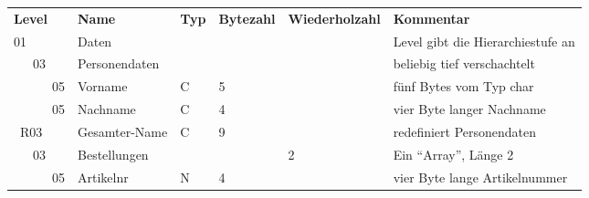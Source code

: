 \begin{tabularx}{\textwidth}{llllll}
\textbf{Level}  & \textbf{Name} & \textbf{Typ} & \textbf{Bytezahl} & \textbf{Wiederholzahl} & \textbf{Kommentar} \\
01 & Daten & & & & Level gibt die Hierarchiestufe an\\
\ \ \ 03 & Personendaten & & & & beliebig tief verschachtelt\\
\ \ \ \ \ \ 05 & Vorname & C & 5 & & fünf Bytes vom Typ char\\
\ \ \ \ \ \ 05 & Nachname & C & 4 & & vier Byte langer Nachname\\
\ R03 & Gesamter-Name & C & 9 & & redefiniert Personendaten\\
\ \ \ 03 & Bestellungen & & & 2 & Ein ``Array'', Länge 2\\
\ \ \ \ \ \ 05 & Artikelnr & N & 4 & & vier Byte lange Artikelnummer\\
\end{tabularx}
     
     
